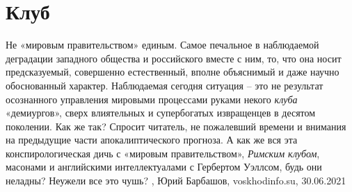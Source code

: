  
 
 
 
 
\chapter{Клуб}

Не «мировым правительством» единым.  Самое печальное в наблюдаемой деградации
западного общества и российского вместе с ним, то, что она носит предсказуемый,
совершенно естественный, вполне объяснимый и даже научно обоснованный характер.
Наблюдаемая сегодня ситуация – это не результат осознанного управления мировыми
процессами руками некого \emph{клуба} «демиургов», сверх влиятельных и
супербогатых извращенцев в десятом поколении.  Как же так? Спросит читатель, не
пожалевший времени и внимания на предыдущие части апокалиптического прогноза. А
как же вся эта конспирологическая дичь с «мировым правительством»,
\emph{Римским клубом}, масонами и английскими интеллектуалами с Гербертом
Уэллсом, будь они неладны? Неужели все это чушь?
, 
Юрий Барбашов, voskhodinfo.su, 30.06.2021
